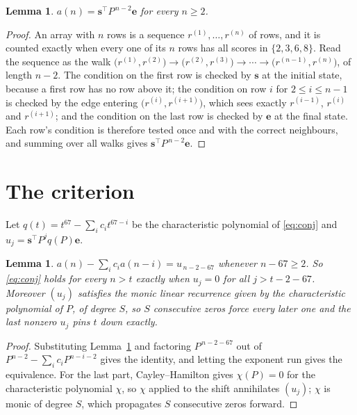 \documentclass[11pt,a4paper]{article}
\theoremstyle{plain}
\newtheorem{lemma}[theorem]{Lemma}
\theoremstyle{definition}
\begin{document}
\begin{lemma}\label{lem:walk}
$a(n)=\mathbf{s}^{\!\top}P^{\,n-2}\mathbf{e}$ for every $n\ge2$.
\end{lemma}

\begin{proof}
An array with $n$ rows is a sequence $r^{(1)},\dots,r^{(n)}$ of rows, and it is counted
exactly when every one of its $n$ rows has all scores in $\{2,3,6,8\}$. Read the sequence as the
walk $\bigl(r^{(1)},r^{(2)}\bigr)\to\bigl(r^{(2)},r^{(3)}\bigr)\to\cdots\to
\bigl(r^{(n-1)},r^{(n)}\bigr)$, of length $n-2$. The condition on the first row is
checked by $\mathbf{s}$ at the initial state, because a first row has no row above it; the
condition on row $i$ for $2\le i\le n-1$ is checked by the edge entering
$\bigl(r^{(i)},r^{(i+1)}\bigr)$, which sees exactly $r^{(i-1)}$, $r^{(i)}$ and
$r^{(i+1)}$; and the condition on the last row is checked by $\mathbf{e}$ at the final
state. Each row's condition is therefore tested once and with the correct neighbours, and
summing over all walks gives $\mathbf{s}^{\!\top}P^{\,n-2}\mathbf{e}$.
\end{proof}

\section{The criterion}

Let $q(t)=t^{67}-\sum_i c_i t^{67-i}$ be the characteristic polynomial of
\eqref{eq:conj} and $u_j=\mathbf{s}^{\!\top}P^{j}q(P)\mathbf{e}$.

\begin{lemma}\label{lem:crit}
$a(n)-\sum_i c_i a(n-i)=u_{\,n-2-67}$ whenever $n-67\ge2$. So \eqref{eq:conj}
holds for every $n>t$ exactly when $u_j=0$ for all $j>t-2-67$. Moreover $(u_j)$
satisfies the monic linear recurrence given by the characteristic polynomial of $P$, of
degree $S$, so $S$ consecutive zeros force every later one and the last nonzero $u_j$ pins
$t$ down exactly.
\end{lemma}

\begin{proof}
Substituting Lemma~\ref{lem:walk} and factoring $P^{\,n-2-67}$ out of
$P^{n-2}-\sum_i c_i P^{n-i-2}$ gives the identity, and letting the exponent run gives the
equivalence. For the last part, Cayley--Hamilton gives $\chi(P)=0$ for the characteristic
polynomial $\chi$, so $\chi$ applied to the shift annihilates $(u_j)$; $\chi$ is monic of
degree $S$, which propagates $S$ consecutive zeros forward.
\end{proof}
\end{document}
